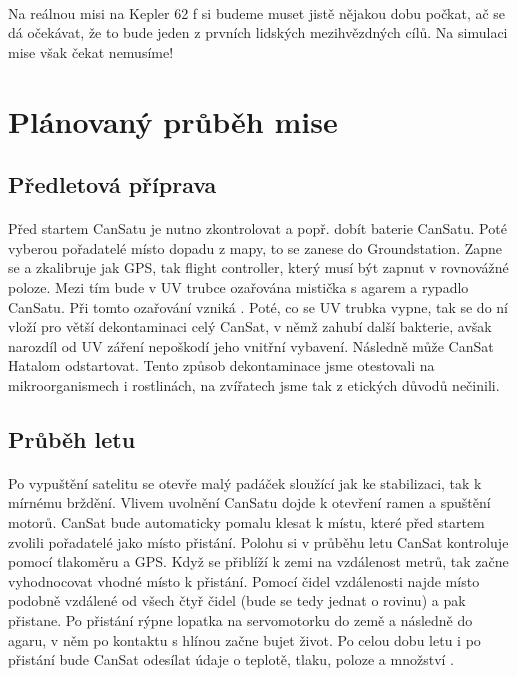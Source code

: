 \documentclass[a4paper]{report}
\begin{document}
\paragraph{} Na reálnou misi na Kepler 62 f si budeme muset jistě nějakou dobu počkat, ač se dá očekávat, že to bude jeden z prvních lidských mezihvězdných cílů. Na simulaci mise však čekat nemusíme!
\section{Plánovaný průběh mise}
\subsection{Předletová příprava}
\paragraph{} Před startem CanSatu je nutno zkontrolovat a popř. dobít baterie CanSatu. Poté vyberou pořadatelé místo dopadu z mapy, to se zanese do Groundstation. Zapne se a zkalibruje jak GPS, tak flight controller, který musí být zapnut v rovnovážné poloze. Mezi tím bude v UV trubce ozařována mistička s agarem a rypadlo CanSatu. Při tomto ozařování vzniká . Poté, co se UV trubka vypne, tak se do ní vloží pro větší dekontaminaci celý CanSat, v němž  zahubí další bakterie, avšak narozdíl od UV záření nepoškodí jeho vnitřní vybavení. Následně může CanSat Hatalom odstartovat. Tento způsob dekontaminace jsme otestovali na mikroorganismech i rostlinách, na zvířatech jsme tak z etických důvodů nečinili.
\subsection{Průběh letu}
\paragraph{} Po vypuštění satelitu se otevře malý padáček sloužící jak ke stabilizaci, tak k mírnému brždění. Vlivem uvolnění CanSatu dojde k otevření ramen a spuštění motorů. CanSat bude automaticky pomalu klesat k místu, které před startem zvolili pořadatelé jako místo přistání. Polohu si v průběhu letu CanSat kontroluje pomocí tlakoměru a GPS. Když se přiblíží k zemi na vzdálenost metrů, tak začne vyhodnocovat vhodné místo k přistání. Pomocí čidel vzdálenosti najde místo podobně vzdálené od všech čtyř čidel (bude se tedy jednat o rovinu) a pak přistane. Po přistání rýpne lopatka na servomotorku do země a následně do agaru, v něm po kontaktu s hlínou začne bujet život. Po celou dobu letu i po přistání bude CanSat odesílat údaje o teplotě, tlaku, poloze a množství .
\end{document}
